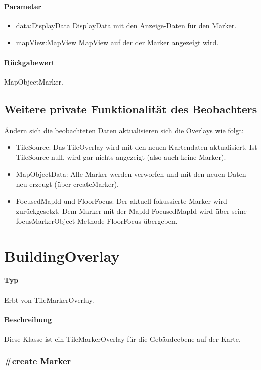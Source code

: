 \paragraph*{Parameter}
\begin{itemize}
    \item data:DisplayData DisplayData mit den Anzeige-Daten für den Marker.
    \item mapView:MapView MapView auf der der Marker angezeigt wird.
\end{itemize}
\paragraph*{Rückgabewert}
MapObjectMarker.


\subsection{Weitere private Funktionalität des Beobachters}
Ändern sich die beobachteten Daten aktualisieren sich die Overlays wie folgt:
\begin{itemize}
    \item TileSource: Das TileOverlay wird mit den neuen Kartendaten aktualisiert.
    Ist TileSource null, wird gar nichts angezeigt (also auch keine Marker).
    \item MapObjectData: Alle Marker werden verworfen und mit den neuen Daten neu erzeugt (über createMarker).
    \item FocusedMapId und FloorFocus: Der aktuell fokussierte Marker wird zurückgesetzt.
    Dem Marker mit der MapId FocusedMapId wird über seine focusMarkerObject-Methode FloorFocus übergeben.
\end{itemize}

\section{BuildingOverlay}
\paragraph*{Typ}
Erbt von TileMarkerOverlay.
\paragraph*{Beschreibung}
Diese Klasse ist ein TileMarkerOverlay für die Gebäudeebene auf der Karte.

\subsubsection{#create Marker}%
